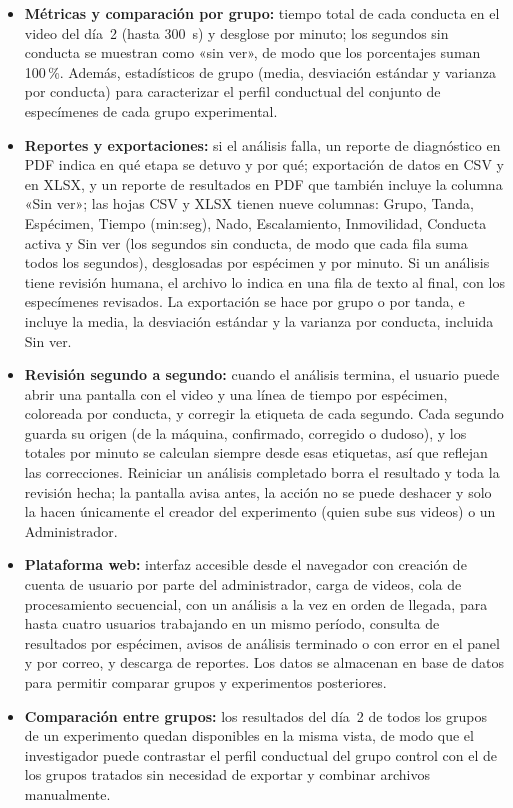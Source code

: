 \begin{itemize}
  \item \textbf{Métricas y comparación por grupo:} tiempo total de cada conducta en
        el video del día~2 (hasta 300~s) y desglose por minuto; los segundos sin
        conducta se muestran como «sin ver», de modo que los porcentajes suman 100\,\%.
        Además, estadísticos de grupo (media, desviación estándar y varianza por conducta)
        para caracterizar el perfil conductual del conjunto de especímenes de cada
        grupo experimental.

  \item \textbf{Reportes y exportaciones:} si el análisis falla, un reporte de
        diagnóstico en PDF indica en qué etapa se detuvo y por qué; exportación de
        datos en CSV y en XLSX, y un reporte de resultados en PDF que también incluye la columna «Sin ver»; las hojas CSV y XLSX tienen nueve columnas: Grupo, Tanda, Espécimen,
        Tiempo (min:seg), Nado, Escalamiento, Inmovilidad, Conducta activa y Sin ver
        (los segundos sin conducta, de modo que cada fila suma todos los segundos),
        desglosadas por espécimen y por minuto. Si un análisis tiene revisión humana, el
        archivo lo indica en una fila de texto al final, con los especímenes revisados.
        La exportación se hace por grupo o por tanda, e incluye la media, la desviación
        estándar y la varianza por conducta, incluida Sin ver.

  \item \textbf{Revisión segundo a segundo:} cuando el análisis termina, el usuario
        puede abrir una pantalla con el video y una línea de tiempo por espécimen,
        coloreada por conducta, y corregir la etiqueta de cada segundo. Cada segundo
        guarda su origen (de la máquina, confirmado, corregido o dudoso), y los totales
        por minuto se calculan siempre desde esas etiquetas, así que reflejan las
        correcciones. Reiniciar un análisis completado borra el resultado y toda la
        revisión hecha; la pantalla avisa antes, la acción no se puede deshacer y solo
        la hacen únicamente el creador del experimento (quien sube sus videos) o un Administrador.

  \item \textbf{Plataforma web:} interfaz accesible desde el navegador con creación
        de cuenta de usuario por parte del administrador, carga de videos, cola de
        procesamiento secuencial, con un análisis a la vez en orden de llegada, para hasta cuatro usuarios trabajando en un mismo período,
        consulta de resultados por espécimen, avisos de análisis terminado o con error
        en el panel y por correo, y descarga de reportes. Los
        datos se almacenan en base de datos para permitir comparar grupos y
        experimentos posteriores.

  \item \textbf{Comparación entre grupos:} los resultados del día~2 de todos los
        grupos de un experimento quedan disponibles en la misma vista, de modo que
        el investigador puede contrastar el perfil conductual del grupo control
        con el de los grupos tratados sin necesidad de exportar y combinar
        archivos manualmente.
\end{itemize}

